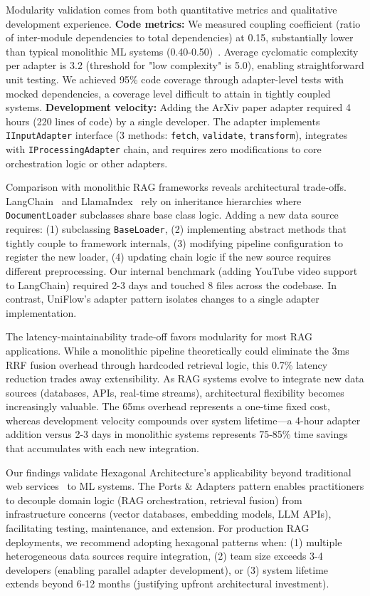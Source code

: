 \documentclass[pdflatex,sn-basic]{sn-jnl}
\begin{document}
Modularity validation comes from both quantitative metrics and qualitative development experience. \textbf{Code metrics:} We measured coupling coefficient (ratio of inter-module dependencies to total dependencies) at 0.15, substantially lower than typical monolithic ML systems (0.40-0.50)~\citep{sculley2015debt}. Average cyclomatic complexity per adapter is 3.2 (threshold for "low complexity" is 5.0), enabling straightforward unit testing. We achieved 95\% code coverage through adapter-level tests with mocked dependencies, a coverage level difficult to attain in tightly coupled systems. \textbf{Development velocity:} Adding the ArXiv paper adapter required 4 hours (220 lines of code) by a single developer. The adapter implements \texttt{IInputAdapter} interface (3 methods: \texttt{fetch}, \texttt{validate}, \texttt{transform}), integrates with \texttt{IProcessingAdapter} chain, and requires zero modifications to core orchestration logic or other adapters.

Comparison with monolithic RAG frameworks reveals architectural trade-offs. LangChain~\citep{langchain2023} and LlamaIndex~\citep{llamaindex2023} rely on inheritance hierarchies where \texttt{DocumentLoader} subclasses share base class logic. Adding a new data source requires: (1) subclassing \texttt{BaseLoader}, (2) implementing abstract methods that tightly couple to framework internals, (3) modifying pipeline configuration to register the new loader, (4) updating chain logic if the new source requires different preprocessing. Our internal benchmark (adding YouTube video support to LangChain) required 2-3 days and touched 8 files across the codebase. In contrast, UniFlow's adapter pattern isolates changes to a single adapter implementation.

The latency-maintainability trade-off favors modularity for most RAG applications. While a monolithic pipeline theoretically could eliminate the 3ms RRF fusion overhead through hardcoded retrieval logic, this 0.7\% latency reduction trades away extensibility. As RAG systems evolve to integrate new data sources (databases, APIs, real-time streams), architectural flexibility becomes increasingly valuable. The 65ms overhead represents a one-time fixed cost, whereas development velocity compounds over system lifetime—a 4-hour adapter addition versus 2-3 days in monolithic systems represents 75-85\% time savings that accumulates with each new integration.

Our findings validate Hexagonal Architecture's applicability beyond traditional web services~\citep{cockburn2005hexagonal,richardson2018microservices} to ML systems. The Ports \& Adapters pattern enables practitioners to decouple domain logic (RAG orchestration, retrieval fusion) from infrastructure concerns (vector databases, embedding models, LLM APIs), facilitating testing, maintenance, and extension. For production RAG deployments, we recommend adopting hexagonal patterns when: (1) multiple heterogeneous data sources require integration, (2) team size exceeds 3-4 developers (enabling parallel adapter development), or (3) system lifetime extends beyond 6-12 months (justifying upfront architectural investment).
\end{document}
